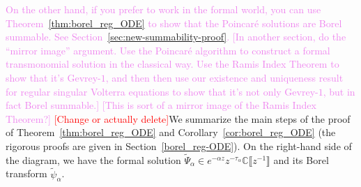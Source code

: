 \documentclass{article}
\newcommand{\C}{\mathbb{C}}
\newcommand{\series}[1]{\tilde{#1}}
\newcommand{\laplace}{\mathcal{L}}
\newcommand{\borel}{\mathcal{B}}
\theoremstyle{definition}
\theoremstyle{plain}
\newtheorem{theorem}{Theorem}[section]
\newtheorem{corollary}[theorem]{Corollary}
\begin{document}
\textcolor{violet}{On the other hand, if you prefer to work in the formal world, you can use Theorem~\ref{thm:borel_reg_ODE} to show that the Poincar\'{e} solutions are Borel summable. See Section~\ref{sec:new-summability-proof}.}
\textcolor{violet}{[In another section, do the ``mirror image'' argument. Use the Poincar\'{e} algorithm to construct a formal transmonomial solution in the classical way. Use the Ramis Index Theorem to show that it's Gevrey-$1$, and then then use our existence and uniqueness result for regular singular Volterra equations to show that it's not only Gevrey-$1$, but in fact Borel summable.]}
\color{black}
\textcolor{Violet}{[This is sort of a mirror image of the Ramis Index Theorem?]}
%
\textcolor{red}{[Change or actually delete]}We summarize the main steps of the proof of Theorem~\ref{thm:borel_reg_ODE} and Corollary~\ref{cor:borel_reg_ODE} (the rigorous proofs are given in Section~\ref{borel_reg-ODE}). On the right-hand side of the diagram, we have the formal solution $\series{\Psi }_\alpha\in e^{-\alpha z}z^{-\tau_\alpha}\C\llbracket z^{-1}\rrbracket$ and its Borel transform $\series{\psi}_\alpha$. %

\begin{center}
\end{center} 
\end{document}
